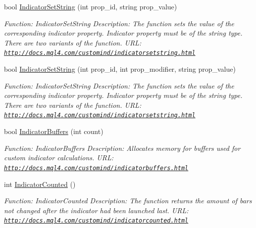 \begin{DoxyCompactItemize}
bool \hyperlink{class_m_q_l4_c_sharp_1_1_base_1_1_m_q_l_base_a434ca24a734e8e73a9aab8e59e7f2177}{Indicator\+Set\+String} (int prop\+\_\+id, string prop\+\_\+value)
\begin{DoxyCompactList}\small\item\em Function\+: Indicator\+Set\+String Description\+: The function sets the value of the corresponding indicator property. Indicator property must be of the string type. There are two variants of the function. U\+RL\+: \href{http://docs.mql4.com/customind/indicatorsetstring.html}{\tt http\+://docs.\+mql4.\+com/customind/indicatorsetstring.\+html} \end{DoxyCompactList}\item 
bool \hyperlink{class_m_q_l4_c_sharp_1_1_base_1_1_m_q_l_base_aea53e1e6364997788ef190ee02478caf}{Indicator\+Set\+String} (int prop\+\_\+id, int prop\+\_\+modifier, string prop\+\_\+value)
\begin{DoxyCompactList}\small\item\em Function\+: Indicator\+Set\+String Description\+: The function sets the value of the corresponding indicator property. Indicator property must be of the string type. There are two variants of the function. U\+RL\+: \href{http://docs.mql4.com/customind/indicatorsetstring.html}{\tt http\+://docs.\+mql4.\+com/customind/indicatorsetstring.\+html} \end{DoxyCompactList}\item 
bool \hyperlink{class_m_q_l4_c_sharp_1_1_base_1_1_m_q_l_base_a2e5c1cabba0d580ac034f2e3c6d8bce3}{Indicator\+Buffers} (int count)
\begin{DoxyCompactList}\small\item\em Function\+: Indicator\+Buffers Description\+: Allocates memory for buffers used for custom indicator calculations. U\+RL\+: \href{http://docs.mql4.com/customind/indicatorbuffers.html}{\tt http\+://docs.\+mql4.\+com/customind/indicatorbuffers.\+html} \end{DoxyCompactList}\item 
int \hyperlink{class_m_q_l4_c_sharp_1_1_base_1_1_m_q_l_base_a5555307971b20fe0e4948c1ab1411340}{Indicator\+Counted} ()
\begin{DoxyCompactList}\small\item\em Function\+: Indicator\+Counted Description\+: The function returns the amount of bars not changed after the indicator had been launched last. U\+RL\+: \href{http://docs.mql4.com/customind/indicatorcounted.html}{\tt http\+://docs.\+mql4.\+com/customind/indicatorcounted.\+html} \end{DoxyCompactList}\item 

\end{DoxyCompactItemize}
